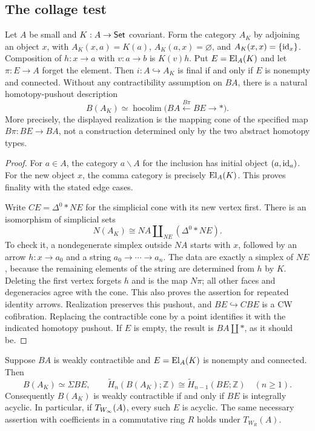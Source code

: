 \subsection{The collage test}

\begin{proposition}\label{B:collage}
Let $A$ be small and $K:A\to\mathsf{Set}$ covariant. Form the category $A_K$ by adjoining an object $x$, with $A_K(x,a)=K(a)$, $A_K(a,x)=\varnothing$, and $A_K(x,x)=\{\mathrm{id}_x\}$. Composition of $h:x\to a$ with $v:a\to b$ is $K(v)h$. Put $E=\operatorname{El}_A(K)$ and let $\pi:E\to A$ forget the element. Then $i:A\hookrightarrow A_K$ is final if and only if $E$ is nonempty and connected. Without any contractibility assumption on $BA$, there is a natural homotopy-pushout description
\[
 B(A_K)\simeq\operatorname{hocolim}\bigl(BA\xleftarrow{B\pi}BE\longrightarrow *\bigr).
\]
More precisely, the displayed realization is the mapping cone of the specified map $B\pi:BE\to BA$, not a construction determined only by the two abstract homotopy types.
\end{proposition}

\begin{proof}
For $a\in A$, the category $a\backslash A$ for the inclusion has initial object $(a,\mathrm{id}_a)$. For the new object $x$, the comma category is precisely $\operatorname{El}_A(K)$. This proves finality with the stated edge cases.

Write $CE=\Delta^0*NE$ for the simplicial cone with its new vertex first. There is an isomorphism of simplicial sets
\[
 N(A_K)\cong NA\amalg_{NE}(\Delta^0*NE).
\]
To check it, a nondegenerate simplex outside $NA$ starts with $x$, followed by an arrow $h:x\to a_0$ and a string $a_0\to\cdots\to a_n$. The data are exactly a simplex of $NE$, because the remaining elements of the string are determined from $h$ by $K$. Deleting the first vertex forgets $h$ and is the map $N\pi$; all other faces and degeneracies agree with the cone. This also proves the assertion for repeated identity arrows. Realization preserves this pushout, and $BE\hookrightarrow CBE$ is a CW cofibration. Replacing the contractible cone by a point identifies it with the indicated homotopy pushout. If $E$ is empty, the result is $BA\amalg *$, as it should be.
\end{proof}

\begin{corollary}\label{B:acyclic-test}
Suppose $BA$ is weakly contractible and $E=\operatorname{El}_A(K)$ is nonempty and connected. Then
\[
 B(A_K)\simeq\Sigma BE,
 \qquad
 \widetilde H_n(B(A_K);\mathbb Z)\cong
 \widetilde H_{n-1}(BE;\mathbb Z)
 \quad(n\geq1).
\]
Consequently $B(A_K)$ is weakly contractible if and only if $BE$ is integrally acyclic. In particular, if $T_{W_{\infty}}(A)$, every such $E$ is acyclic. The same necessary assertion with coefficients in a commutative ring $R$ holds under $T_{W_R}(A)$.
\end{corollary}

